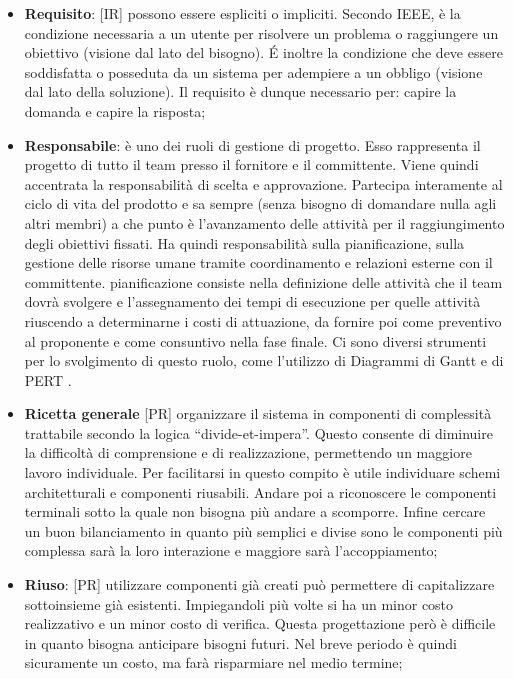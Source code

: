 \begin{itemize}
	\item \textbf{Requisito}: [IR] possono essere espliciti o impliciti. Secondo IEEE, è la condizione necessaria a un utente per risolvere un problema o raggiungere un obiettivo (visione dal lato del bisogno). \'E inoltre la condizione che deve essere soddisfatta o posseduta da un sistema per adempiere a un obbligo (visione dal lato della soluzione). \newline
	Il requisito è dunque necessario per: capire la domanda e capire la risposta;

	\item \textbf{Responsabile}: è uno dei ruoli di gestione di progetto. Esso rappresenta il progetto di tutto il team presso il fornitore e il committente. Viene quindi accentrata la responsabilità di scelta e approvazione. \newline
	Partecipa interamente al ciclo di vita del prodotto e sa sempre (senza bisogno di domandare nulla agli altri membri) a che punto è l'avanzamento delle attività per il raggiungimento degli obiettivi fissati. \newline
	Ha quindi responsabilità sulla pianificazione, sulla gestione delle risorse umane tramite coordinamento e relazioni esterne con il committente. \newline
 	pianificazione consiste nella definizione delle attività che il team dovrà svolgere e l'assegnamento dei tempi di esecuzione per quelle attività riuscendo a determinarne i costi di attuazione, da fornire poi come preventivo al proponente e come consuntivo nella fase finale. \newline
	Ci sono diversi strumenti per lo svolgimento di questo ruolo, come l'utilizzo di Diagrammi di Gantt e di PERT .

	\item \textbf{Ricetta generale} [PR] organizzare il sistema in componenti di complessità trattabile secondo la logica ``divide-et-impera''. Questo consente di diminuire la difficoltà di comprensione e di realizzazione, permettendo un maggiore lavoro individuale. Per facilitarsi in questo compito è utile individuare schemi architetturali e componenti riusabili. Andare poi a riconoscere le componenti terminali sotto la quale non bisogna più andare a scomporre. Infine cercare un buon bilanciamento in quanto più semplici e divise sono le componenti più complessa sarà la loro interazione e maggiore sarà l'accoppiamento;

	\item \textbf{Riuso}: [PR] utilizzare componenti già creati può permettere di capitalizzare sottoinsieme già esistenti. Impiegandoli più volte si ha un minor costo realizzativo e un minor costo di verifica. Questa progettazione però è difficile in quanto bisogna anticipare bisogni futuri. Nel breve periodo è quindi sicuramente un costo, ma farà risparmiare nel medio termine;


\end{itemize}
